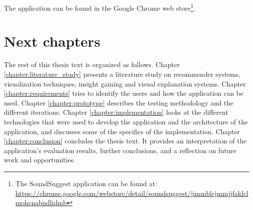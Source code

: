 The application can be found in the Google Chrome web store\footnote{The SoundSuggest application can be found at: \url{https://chrome.google.com/webstore/detail/soundsuggest/jimmblcjmmjjfaklclmohcnabndlidmb}}.


\section{Next chapters}\label{chapter:introduction:section:chapters}

The rest of this thesis text is organized as follows. Chapter \ref{chapter:literature_study} presents a literature study on recommender systems, visualization techniques, insight gaining and visual explanation systems. Chapter \ref{chapter:requirements} tries to identify the users and how the application can be used. Chapter \ref{chapter:prototype} describes the testing methodology and the different iterations. Chapter \ref{chapter:implementation} looks at the different technologies that were used to develop the application and the architecture of the application, and discusses some of the specifics of the implementation. Chapter \ref{chapter:conclusion} concludes the thesis text. It provides an interpretation of the application's evaluation results, further conclusions, and a reflection on future work and opportunities.
